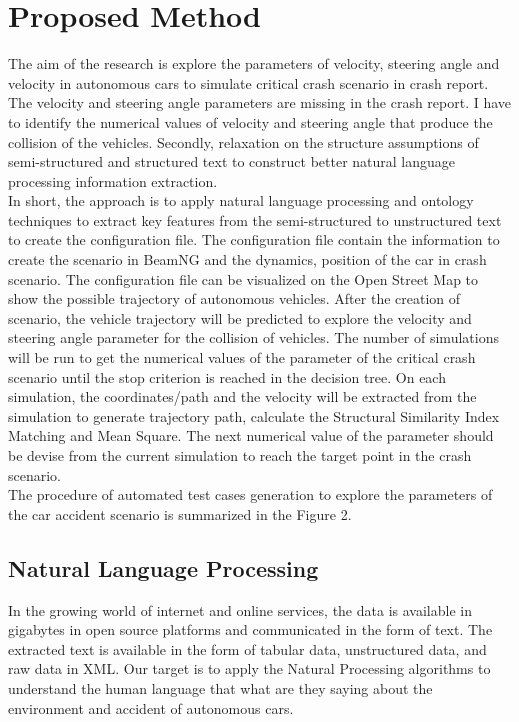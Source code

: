 \section{Proposed Method}
The aim of the research is explore the parameters of velocity, steering angle and velocity in autonomous cars to simulate critical crash scenario in crash report. The velocity and steering angle parameters are missing in the crash report. I have to identify the numerical values of velocity and steering angle that produce the collision of the vehicles. Secondly, relaxation on the structure assumptions of semi-structured and structured text to construct better natural language processing information extraction. \\

In short, the approach is to apply natural language processing and ontology techniques to extract key features from the semi-structured to unstructured text to create the configuration file. The configuration file contain the information to create the scenario in BeamNG and the dynamics, position of the car in crash scenario. The configuration file can be visualized on the Open Street Map to show the possible trajectory of autonomous vehicles. After the creation of scenario, the vehicle trajectory will be predicted to explore the velocity and steering angle parameter for the collision of vehicles. The number of simulations will be run to get the numerical values of the parameter of the critical crash scenario until the stop criterion is reached in the decision tree. On each simulation, the coordinates/path and the velocity will be extracted from the simulation to generate trajectory path, calculate the Structural Similarity Index Matching and Mean Square. The next numerical value of the parameter should be devise from the current simulation to reach the target point in the crash scenario. \\       

The procedure of automated test cases generation to explore the parameters of the car accident scenario is summarized in the Figure 2. \\

\subsection{Natural Language Processing}
In the growing world of internet and online services, the data is available in gigabytes in open source platforms and communicated in the form of text. The extracted text is available in the form of tabular data, unstructured data, and raw data in XML. Our target is to apply the Natural Processing algorithms to understand the human language that what are they saying about the environment and accident of autonomous cars.

